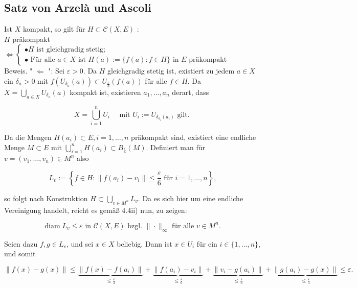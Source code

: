 \documentclass[10pt, letterpaper]{article}
\begin{document}
\subsection*{Satz von Arzelà und Ascoli}
Ist $X$ kompakt, so gilt für $H \subset \mathcal{C}(X, E)$ :\\
$H$ präkompakt $\Longleftrightarrow\left\{\begin{array}{l}\bullet H \text { ist gleichgradig stetig; } \\ \bullet \text { Für alle } a \in X \text { ist } H(a):=\{f(a): f \in H\} \text { in } E \text { präkompakt }\end{array}\right.$\\
Beweis. " $\Longleftarrow$ ": Sei $\varepsilon>0$. Da $H$ gleichgradig stetig ist, existiert zu jedem $a \in X$ ein $\delta_{a}>0$ mit $f\left(U_{\delta_{a}}(a)\right) \subset U_{\frac{\varepsilon}{3}}(f(a))$ für alle $f \in H$. Da $X=\bigcup_{a \in X} U_{\delta_{a}}(a)$ kompakt ist, existieren $a_{1}, \ldots, a_{n}$ derart, dass

$$
X=\bigcup_{i=1}^{n} U_{i} \quad \text { mit } U_{i}:=U_{\delta_{a_{i}}\left(a_{i}\right)} \text { gilt. }
$$

Da die Mengen $H\left(a_{i}\right) \subset E, i=1, \ldots, n$ präkompakt sind, existiert eine endliche Menge $M \subset E$ mit $\bigcup_{i=1}^{n} H\left(a_{i}\right) \subset B_{\frac{\varepsilon}{6}}(M)$. Definiert man für $v=\left(v_{1}, \ldots, v_{n}\right) \in M^{n}$ also

$$
L_{v}:=\left\{f \in H:\left\|f\left(a_{i}\right)-v_{i}\right\| \leq \frac{\varepsilon}{6} \text { für } i=1, \ldots, n\right\},
$$

so folgt nach Konstruktion $H \subset \bigcup_{v \in M^{n}} L_{v}$. Da es sich hier um eine endliche Vereinigung handelt, reicht es gemäß 4.4ii) nun, zu zeigen:

$$
\operatorname{diam} L_{v} \leq \varepsilon \text { in } \mathcal{C}(X, E) \text { bzgl. }\|\cdot\|_{\infty} \text { für alle } v \in M^{n} \text {. }
$$

Seien dazu $f, g \in L_{v}$, und sei $x \in X$ beliebig. Dann ist $x \in U_{i}$ für ein $i \in\{1, \ldots, n\}$, und somit

$$
\|f(x)-g(x)\| \leq \underbrace{\left\|f(x)-f\left(a_{i}\right)\right\|}_{\leq \frac{\varepsilon}{3}}+\underbrace{\left\|f\left(a_{i}\right)-v_{i}\right\|}_{\leq \frac{\varepsilon}{6}}+\underbrace{\left\|v_{i}-g\left(a_{i}\right)\right\|}_{\leq \frac{\varepsilon}{6}}+\underbrace{\left\|g\left(a_{i}\right)-g(x)\right\|}_{\leq \frac{\varepsilon}{3}} \leq \varepsilon .
$$
\end{document}
